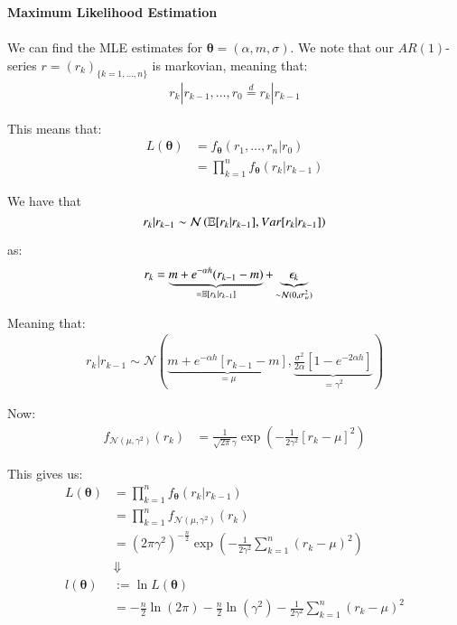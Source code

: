 \newpage 
\textbf{Maximum Likelihood Estimation}
\\~\\ 
We can find the MLE   estimates for $\bm{\theta} = (\alpha, m, \sigma)$. We note that our $AR(1)$-series $r = (r_{k})_{\{k = 1, \dots, n\}}$ is markovian, meaning that: 
\begin{align*}
r_{k}|r_{k-1}, \dots, r_{0} \stackrel{d}{=} r_{k}|r_{k-1}    
\end{align*}

This means that: 
\begin{align*}
L(\bm{\theta}) &= f_{\bm{\theta}}(r_{1}, \dots, r_{n}|r_{0}) \\ 
&= \prod_{k=1}^{n}f_{\bm{\theta}}(r_{k}|r_{k-1})
\end{align*}

We have that 
\[
r_{k}|r_{k-1} \sim \mathcal{N}\left(
\mathbb{E}[r_{k}|r_{k-1}], Var[r_{k}|r_{k-1}]
\right)
\]

as: 
\begin{align*}
r_{k} &= \underbrace{m + e^{-\alpha h}(r_{k-1}-m)}_{= \mathbb{E}[r_{k}|r_{k-1}]} 
+ \underbrace{\epsilon_{k}}_{\sim \mathcal{N}(0, \sigma_{w}^{2})}    
\end{align*}

Meaning that: 
\begin{align*}
r_{k}|r_{k-1} \sim \mathcal{N}\left(
\underbrace{
m + e^{-\alpha h}[r_{k-1}-m]
}_{= \mu}, 
\underbrace{
\frac{\sigma^{2}}{2\alpha}\left[1-e^{-2\alpha h}\right]
}_{= \gamma^{2}}
\right)    
\end{align*}

Now: 
\begin{align*}
f_{\mathcal{N}(\mu, \gamma^{2})}(r_{k}) &=
\frac{1}{\sqrt{2\pi}\gamma}\exp\left(
-\frac{1}{2\gamma^{2}}\left[r_{k} - \mu \right]^{2}
\right)
\end{align*}

This gives us: 
\begin{align*}
L(\bm{\theta}) &= \prod_{k=1}^{n}f_{\bm{\theta}}(r_{k}|r_{k-1}) \\ 
&= 
\prod_{k=1}^{n}f_{\mathcal{N}(\mu, \gamma^{2})}(r_{k}) 
\\ 
&= 
(2\pi\gamma^{2})^{-\frac{n}{2}}\exp\left(
-\frac{1}{2\gamma^{2}}\sum_{k=1}^{n}\left(
r_{k} - \mu
\right)^{2}
\right) \\ 
&\Downarrow \\ 
l(\bm{\theta}) &:= \ln L(\bm{\theta}) \\
&= 
-\frac{n}{2}\ln(2\pi) - \frac{n}{2}\ln(\gamma^{2})
-\frac{1}{2\gamma^{2}}\sum_{k=1}^{n}\left(r_{k} - \mu \right)^{2}
\end{align*}


